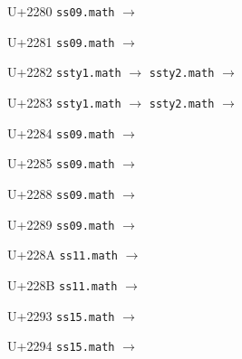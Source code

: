 \documentclass{article}
\begin{document}
\begin{substitutions}
\goodbreak

U+2280  \linebreak
    \texttt{ss09.math} $\to$  

\goodbreak

U+2281  \linebreak
    \texttt{ss09.math} $\to$  

\goodbreak

U+2282  \linebreak
    \texttt{ssty1.math} $\to$  \linebreak
    \texttt{ssty2.math} $\to$  

\goodbreak

U+2283  \linebreak
    \texttt{ssty1.math} $\to$  \linebreak
    \texttt{ssty2.math} $\to$  

\goodbreak

U+2284  \linebreak
    \texttt{ss09.math} $\to$  

\goodbreak

U+2285  \linebreak
    \texttt{ss09.math} $\to$  

\goodbreak

U+2288  \linebreak
    \texttt{ss09.math} $\to$  

\goodbreak

U+2289  \linebreak
    \texttt{ss09.math} $\to$  

\goodbreak

U+228A  \linebreak
    \texttt{ss11.math} $\to$  

\goodbreak

U+228B  \linebreak
    \texttt{ss11.math} $\to$  

\goodbreak

U+2293  \linebreak
    \texttt{ss15.math} $\to$  

\goodbreak

U+2294  \linebreak
    \texttt{ss15.math} $\to$  


\end{substitutions}
\end{document}
